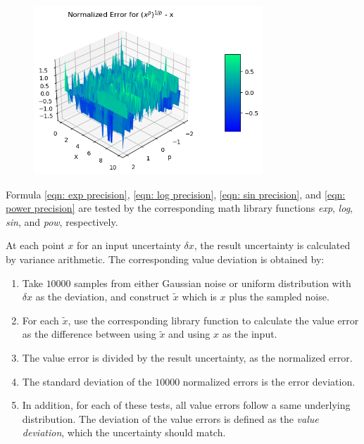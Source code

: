 \documentclass[twoside]{article}
\numberwithin{equation}{section}
\begin{document}
\begin{figure}[p]
\centering
\includegraphics[height=2.5in]{Power_Error.png} 
\label{fig: Power_Error}
\end{figure}


Formula \eqref{eqn: exp precision}, \eqref{eqn: log precision}, \eqref{eqn: sin precision}, and \eqref{eqn: power precision} are tested by the corresponding math library functions \textit{exp}, \textit{log}, \textit{sin}, and \textit{pow}, respectively.

At each point $x$ for an input uncertainty $\delta x$, the result uncertainty is calculated by variance arithmetic.
The corresponding value deviation is obtained by:
\begin{enumerate}

\item Take $10000$ samples from either Gaussian noise or uniform distribution with $\delta x$ as the deviation, and construct $\tilde{x}$ which is $x$ plus the sampled noise.  

\item For each $\tilde{x}$, use the corresponding library function to calculate the value error as the difference between using $\tilde{x}$ and using $x$ as the input.

\item The value error is divided by the result uncertainty, as the normalized error.

\item The standard deviation of the $10000$ normalized errors is the error deviation.

\item In addition, for each of these tests, all value errors follow a same underlying distribution.
The deviation of the value errors is defined as the \emph{value deviation}, which the uncertainty should match.

\end{enumerate}
\end{document}
